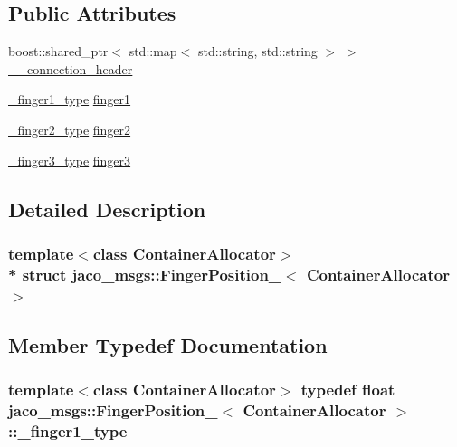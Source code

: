 \subsection*{Public Attributes}
\begin{DoxyCompactItemize}
\item 
boost\+::shared\+\_\+ptr$<$ std\+::map$<$ std\+::string, std\+::string $>$ $>$ \hyperlink{structjaco__msgs_1_1FingerPosition___ab85e7311b4ade23eed568a21589ae12f}{\+\_\+\+\_\+connection\+\_\+header}
\item 
\hyperlink{structjaco__msgs_1_1FingerPosition___ac5de244eb53b4bb0d3407b07b5769b8b}{\+\_\+finger1\+\_\+type} \hyperlink{structjaco__msgs_1_1FingerPosition___a5e08265efb8023ba04d99d556e186b14}{finger1}
\item 
\hyperlink{structjaco__msgs_1_1FingerPosition___afef383694b756f484b98bdd8d8b4c945}{\+\_\+finger2\+\_\+type} \hyperlink{structjaco__msgs_1_1FingerPosition___a7dcdd9f48dc0ff847c0170a096038917}{finger2}
\item 
\hyperlink{structjaco__msgs_1_1FingerPosition___a0efba96ee62a6a41fe83c572572a4170}{\+\_\+finger3\+\_\+type} \hyperlink{structjaco__msgs_1_1FingerPosition___abb7ec1eff7489809a20c32b8ea19386b}{finger3}
\end{DoxyCompactItemize}


\subsection{Detailed Description}
\subsubsection*{template$<$class Container\+Allocator$>$\\*
struct jaco\+\_\+msgs\+::\+Finger\+Position\+\_\+$<$ Container\+Allocator $>$}



\subsection{Member Typedef Documentation}
\subsubsection[{\texorpdfstring{\+\_\+finger1\+\_\+type}{_finger1_type}}]{\setlength{\rightskip}{0pt plus 5cm}template$<$class Container\+Allocator$>$ typedef float {\bf jaco\+\_\+msgs\+::\+Finger\+Position\+\_\+}$<$ Container\+Allocator $>$\+::{\bf \+\_\+finger1\+\_\+type}}\hypertarget{structjaco__msgs_1_1FingerPosition___ac5de244eb53b4bb0d3407b07b5769b8b}{}\label{structjaco__msgs_1_1FingerPosition___ac5de244eb53b4bb0d3407b07b5769b8b}

